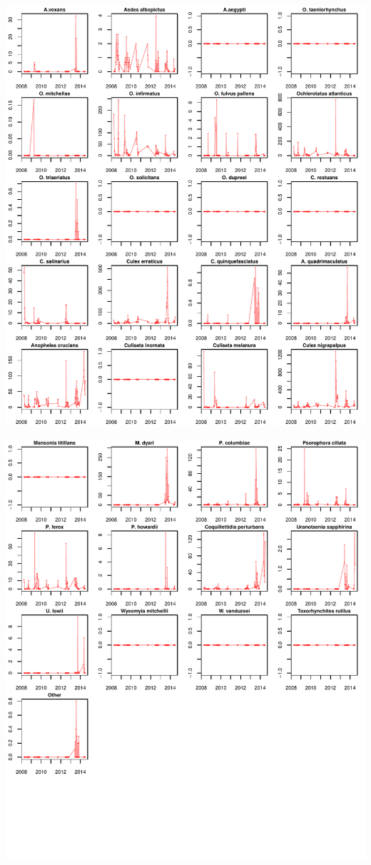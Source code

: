 \documentclass{article}
\begin{document}
\includegraphics{mosquitoReport-008}


\includegraphics{mosquitoReport-009}
\end{document}
